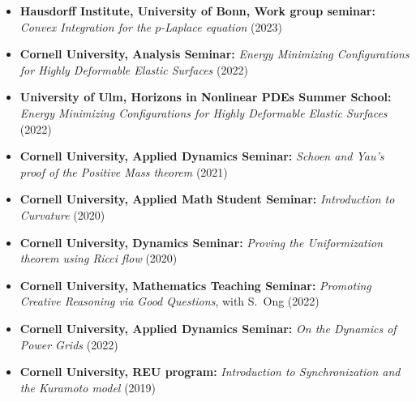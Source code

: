 \documentclass[margin]{res} %
\begin{document}
\begin{resume}
\begin{itemize}
	\item \textbf{Hausdorff Institute, University of Bonn, Work group seminar:} \textit{Convex Integration for the $p$-Laplace equation} (2023)
	\item \textbf{Cornell University, Analysis Seminar:} \textit{Energy Minimizing Configurations for Highly Deformable Elastic Surfaces} (2022)
	\item \textbf{University of Ulm, Horizons in Nonlinear PDEs Summer School:} \textit{Energy Minimizing Configurations for Highly Deformable Elastic Surfaces} (2022)
	\item \textbf{Cornell University, Applied Dynamics Seminar:} \textit{Schoen and Yau's proof of the Positive Mass theorem} (2021)
	\item \textbf{Cornell University, Applied Math Student Seminar:} \textit{Introduction to Curvature} (2020)
	\item \textbf{Cornell University, Dynamics Seminar:} \textit{Proving the Uniformization theorem using Ricci flow} (2020)
	\item \textbf{Cornell University, Mathematics Teaching Seminar:} \textit{Promoting Creative Reasoning via Good Questions}, with S.~Ong (2022)
	\item \textbf{Cornell University, Applied Dynamics Seminar:} \textit{On the Dynamics of Power Grids} (2022)
	\item \textbf{Cornell University, REU program:} \textit{Introduction to Synchronization and the Kuramoto model} (2019)
\end{itemize}


\end{resume}
\end{document}
